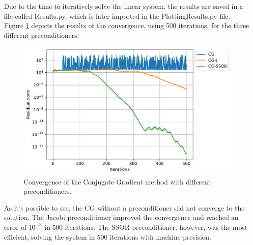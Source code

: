 Due to the time to iteratively solve the linear system, the results are saved in a file called Results.py, which is later imported in the PlottingResults.py file. Figure \ref{fig:results} depicts the results of the convergence, using 500 iterations, for the three different preconditioners.
\begin{figure}[H]
    \centering
    \includegraphics[width=\textwidth]{Figures/Results.pdf}
    \caption{Convergence of the Conjugate Gradient method with different preconditioners.}
    \label{fig:results}
\end{figure} 

As it's possible to see, the CG without a preconditioner did not converge to the solution. The Jacobi preconditioner improved the convergence and reached an error of $10^{-3}$ in 500 iterations. The SSOR preconditioner, however, was the most efficient, solving the system in 500 iterations with machine precision.

